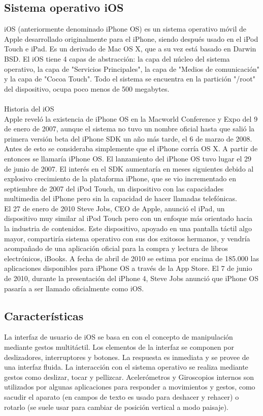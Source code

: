 	\subsection{Sistema operativo iOS}
	iOS (anteriormente denominado iPhone OS) es un sistema operativo móvil de Apple desarrollado originalmente para el iPhone, siendo después usado en el iPod Touch e iPad. Es un derivado de Mac OS X, que a su vez está basado en Darwin BSD. El iOS tiene 4 capas de abstracción: la capa del núcleo del sistema operativo, la capa de "Servicios Principales", la capa de "Medios de comunicación" y la capa de "Cocoa Touch". Todo el sistema se encuentra en la partición "/root" del dispositivo, ocupa poco menos de 500 megabytes. \cite{11}\\ \\
	Historia del iOS\\
	Apple reveló la existencia de iPhone OS en la Macworld Conference y Expo del 9 de enero de 2007, aunque el sistema no tuvo un nombre oficial hasta que salió la primera versión beta del iPhone SDK un año más tarde, el 6 de marzo de 2008. Antes de esto se consideraba simplemente que el iPhone corría OS X. A partir de entonces se llamaría iPhone OS. El lanzamiento del iPhone OS tuvo lugar el 29 de junio de 2007. El interés en el SDK aumentaría en meses siguientes debido al explosivo crecimiento de la plataforma iPhone, que se vio incrementado en septiembre de 2007 del iPod Touch, un dispositivo con las capacidades multimedia del iPhone pero sin la capacidad de hacer llamadas telefónicas. \cite{12}\\
	
	El 27 de enero de 2010 Steve Jobs, CEO de Apple, anunció el iPad, un dispositivo muy similar al iPod Touch pero con un enfoque más orientado hacia la industria de contenidos. Este dispositivo, apoyado en una pantalla táctil algo mayor, compartiría sistema operativo con sus dos exitosos hermanos, y vendría acompañado de una aplicación oficial para la compra y lectura de libros electrónicos, iBooks. A fecha de abril de 2010 se estima por encima de 185.000 las aplicaciones disponibles para iPhone OS a través de la App Store. El 7 de junio de 2010, durante la presentación del iPhone 4, Steve Jobs anunció que iPhone OS pasaría a ser llamado oficialmente como iOS. \cite{12}
	\subsection{Características}
	La interfaz de usuario de iOS se basa en con el concepto de manipulación mediante gestos multitáctil. Los elementos de la interfaz se componen por deslizadores, interruptores y botones. La respuesta es inmediata y se provee de una interfaz fluida. La interacción con el sistema operativo se realiza mediante gestos como deslizar, tocar y pellizcar. Acelerómetros y Giroscopios internos son utilizados por algunas aplicaciones para responder a movimientos y gestos, como sacudir el aparato (en campos de texto es usado para deshacer y rehacer) o rotarlo (se suele usar para cambiar de posición vertical a modo paisaje). \cite{13}\\
	
